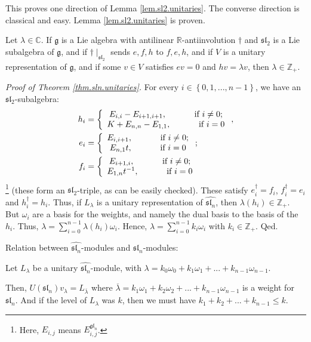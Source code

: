 \documentclass[etingof-lie.tex]{subfiles}
\begin{document}
This proves one direction of Lemma \ref{lem.sl2.unitaries}. The converse
direction is classical and easy. Lemma \ref{lem.sl2.unitaries} is proven.

\begin{corollary}
Let $\lambda\in\mathbb{C}$. If $\mathfrak{g}$ is a Lie algebra with antilinear
$\mathbb{R}$-antiinvolution $\dag$ and $\mathfrak{sl}_{2}$ is a Lie subalgebra
of $\mathfrak{g}$, and if $\dag\mid_{\mathfrak{sl}_{2}}$ sends $e,f,h$ to
$f,e,h$, and if $V$ is a unitary representation of $\mathfrak{g}$, and if some
$v\in V$ satisfies $ev=0$ and $hv=\lambda v$, then $\lambda\in\mathbb{Z}_{+}$.
\end{corollary}

\textit{Proof of Theorem \ref{thm.sln.unitaries}.} For every $i\in\left\{
0,1,...,n-1\right\}  $, we have an $\mathfrak{sl}_{2}$-subalgebra:%
\begin{align*}
h_{i}  &  =\left\{
\begin{array}
[c]{c}%
E_{i,i}-E_{i+1,i+1},\ \ \ \ \ \ \ \ \ \ \text{if }i\neq0;\\
K+E_{n,n}-E_{1,1},\ \ \ \ \ \ \ \ \ \ \text{if }i=0
\end{array}
\right.  ,\\
e_{i}  &  =\left\{
\begin{array}
[c]{c}%
E_{i,i+1},\ \ \ \ \ \ \ \ \ \ \text{if }i\neq0;\\
E_{n,1}t,\ \ \ \ \ \ \ \ \ \ \text{if }i=0
\end{array}
\right.  ;\\
f_{i}  &  =\left\{
\begin{array}
[c]{c}%
E_{i+1,i},\ \ \ \ \ \ \ \ \ \ \text{if }i\neq0;\\
E_{1,n}t^{-1},\ \ \ \ \ \ \ \ \ \ \text{if }i=0
\end{array}
\right.
\end{align*}
\footnote{Here, $E_{i,j}$ means $E_{i,j}^{\mathfrak{gl}_{n}}$.} (these form an
$\mathfrak{sl}_{2}$-triple, as can be easily checked). These satisfy
$e_{i}^{\dag}=f_{i}$, $f_{i}^{\dag}=e_{i}$ and $h_{i}^{\dag}=h_{i}$. Thus, if
$L_{\lambda}$ is a unitary representation of $\widehat{\mathfrak{sl}_{n}}$,
then $\lambda\left(  h_{i}\right)  \in\mathbb{Z}_{+}$. But $\omega_{i}$ are a
basis for the weights, and namely the dual basis to the basis of the $h_{i}$.
Thus, $\lambda=\sum\limits_{i=0}^{n-1}\lambda\left(  h_{i}\right)  \omega_{i}%
$. Hence, $\lambda=\sum\limits_{i=0}^{n-1}k_{i}\omega_{i}$ with $k_{i}%
\in\mathbb{Z}_{+}$. Qed.

\begin{remark}
Relation between $\widehat{\mathfrak{sl}_{n}}$-modules and $\mathfrak{sl}_{n}$-modules:

Let $L_{\lambda}$ be a unitary $\widehat{\mathfrak{sl}_{n}}$-module, with
$\lambda=k_{0}\omega_{0}+k_{1}\omega_{1}+...+k_{n-1}\omega_{n-1}$.

Then, $U\left(  \mathfrak{sl}_{n}\right)  v_{\lambda}=L_{\overline{\lambda}}$
where $\overline{\lambda}=k_{1}\omega_{1}+k_{2}\omega_{2}+...+k_{n-1}%
\omega_{n-1}$ is a weight for $\mathfrak{sl}_{n}$. And if the level of
$L_{\lambda}$ was $k$, then we must have $k_{1}+k_{2}+...+k_{n-1}\leq k$.
\end{remark}
\end{document}
